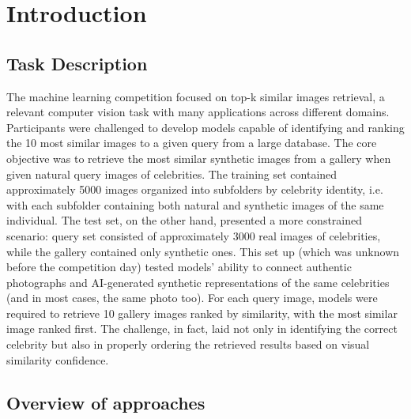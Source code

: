 \section{Introduction}
\label{sec:intro}


\subsection{Task Description}

The machine learning competition focused on top-k similar images retrieval, a relevant computer vision task with many applications across different domains.
Participants were challenged to develop models capable of identifying and ranking the 10 most similar images to a given query from a large database.
The core objective was to retrieve the most similar synthetic images from a gallery when given natural query images of celebrities.
The training set contained approximately 5000 images organized into subfolders by celebrity identity, i.e. with each subfolder containing both natural and synthetic images of the same individual.
The test set, on the other hand, presented a more constrained scenario: query set consisted of approximately 3000 real images of celebrities, while the gallery contained only synthetic ones. 
This set up (which was unknown before the competition day) tested models' ability to connect authentic photographs and AI-generated synthetic representations of the same celebrities (and in most cases, the same photo too). 
For each query image, models were required to retrieve 10 gallery images ranked by similarity, with the most similar image ranked first. 
The challenge, in fact, laid not only in identifying the correct celebrity but also in properly ordering the retrieved results based on visual similarity confidence. 

\subsection{Overview of approaches}

